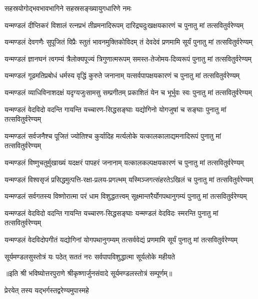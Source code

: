 {सहस्रयोगोद्भवभावभागिने सहस्रसङ्ख्यायुगधारिणे नमः}

\twolineshloka
{यन्मण्डलं दीप्तिकरं विशालं रत्नप्रभं तीव्रमनादिरूपम्}
{दारिद्र्यदुःखक्षयकारणं च पुनातु मां तत्सवितुर्वरेण्यम्}

\twolineshloka
{यन्मण्डलं देवगणैः सुपूजितं   विप्रैः स्तुतं भावनमुक्तिकोविदम्}
{तं देवदेवं प्रणमामि सूर्यं   पुनातु मां तत्सवितुर्वरेण्यम्}

\twolineshloka
{यन्मण्डलं ज्ञानघनं त्वगम्यं   त्रैलोक्यपूज्यं त्रिगुणात्मरूपम्}
{समस्त-तेजोमय-दिव्यरूपं   पुनातु मां तत्सवितुर्वरेण्यम्}

\twolineshloka
{यन्मण्डलं गूढमतिप्रबोधं   धर्मस्य वृद्धिं कुरुते जनानाम्}
{यत्सर्वपापक्षयकारणं च   पुनातु मां तत्सवितुर्वरेण्यम्}

\twolineshloka
{यन्मण्डलं व्याधिविनाशदक्षं   यदृग्यजुःसामसु सम्प्रगीतम्}
{प्रकाशितं येन च भूर्भुवः स्वः   पुनातु मां तत्सवितुर्वरेण्यम्}

\twolineshloka
{यन्मण्डलं वेदविदो वदन्ति   गायन्ति यच्चारण-सिद्धसङ्घाः}
{यद्योगिनो योगजुषां च सङ्घाः   पुनातु मां तत्सवितुर्वरेण्यम्}

\twolineshloka
{यन्मण्डलं सर्वजनैश्च पूजितं   ज्योतिश्च कुर्यादिह मर्त्यलोके}
{यत्कालकालाद्यमनादिरूपं   पुनातु मां तत्सवितुर्वरेण्यम्}

\twolineshloka
{यन्मण्डलं विष्णुचतुर्मुखाख्यं यदक्षरं पापहरं जनानाम्}
{यत्कालकल्पक्षयकारणं च   पुनातु मां तत्सवितुर्वरेण्यम्}

\twolineshloka
{यन्मण्डलं विश्वसृजं प्रसिद्धमुत्पत्ति-रक्षा-प्रलय-प्रगल्भम्}
{यस्मिञ्जगत्संहरतेऽखिलं च   पुनातु मां तत्सवितुर्वरेण्यम्}

\twolineshloka
{यन्मण्डलं सर्वगतस्य विष्णोरात्मा   परं धाम विशुद्धतत्त्वम्}
{सूक्ष्मान्तरैर्योगपथानुगम्यं   पुनातु मां तत्सवितुर्वरेण्यम्}

\twolineshloka
{यन्मण्डलं वेदविदो वदन्ति   गायन्ति यच्चारण-सिद्धसङ्घाः}
{यन्मण्डलं वेदविदः स्मरन्ति   पुनातु मां तत्सवितुर्वरेण्यम्}

\twolineshloka
{यन्मण्डलं वेदविदोपगीतं   यद्योगिनां योगपथानुगम्यम्}
{तत्सर्ववेद्यं  प्रणमामि सूर्यं   पुनातु मां तत्सवितुर्वरेण्यम्}

\twolineshloka
{सूर्यमण्डलसुस्तोत्रं यः पठेत् सततं नरः}
{सर्वपापविशुद्धात्मा  सूर्यलोके महीयते}

॥इति श्री भविष्योत्तरपुराणे श्रीकृष्णार्जुनसंवादे सूर्यमण्डलस्तोत्रं सम्पूर्णम्॥
\closesection

{प्रेरयेत् तस्य यद्भर्गस्तद्वरेण्यमुपास्महे}
